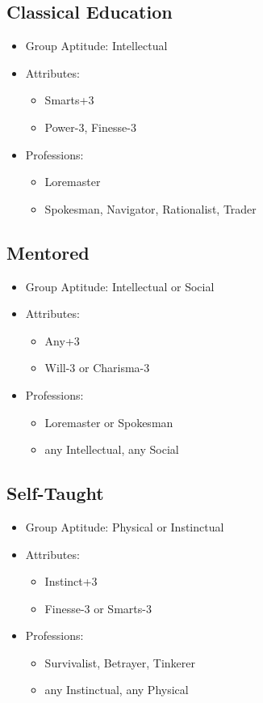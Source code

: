 \subsection{Classical Education}
\begin{itemize}
	\item Group Aptitude: Intellectual
	\item Attributes:
	\begin{itemize}
		\item Smarts+3
		\item Power-3, Finesse-3
	\end{itemize}
	\item Professions:
	\begin{itemize}
		\item Loremaster
		\item Spokesman, Navigator, Rationalist, Trader
	\end{itemize}
\end{itemize}

\subsection{Mentored}
\begin{itemize}
	\item Group Aptitude: Intellectual or Social
	\item Attributes:
	\begin{itemize}
		\item Any+3
		\item Will-3 or Charisma-3
	\end{itemize}
	\item Professions:
	\begin{itemize}
		\item Loremaster or Spokesman
		\item any Intellectual, any Social
	\end{itemize}
\end{itemize}

\subsection{Self-Taught}
\begin{itemize}
	\item Group Aptitude: Physical or Instinctual
	\item Attributes:
	\begin{itemize}
		\item Instinct+3
		\item Finesse-3 or Smarts-3
	\end{itemize}
	\item Professions:
	\begin{itemize}
		\item Survivalist, Betrayer, Tinkerer
		\item any Instinctual, any Physical
	\end{itemize}
\end{itemize}

